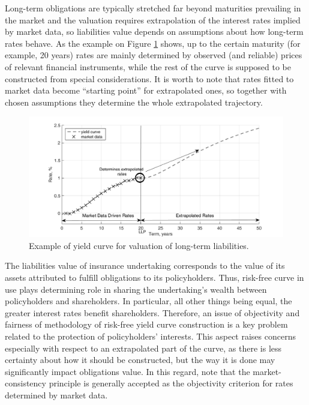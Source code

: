 	Long-term obligations are typically stretched far beyond maturities prevailing in the market and the valuation requires extrapolation of the interest rates implied by market data, so liabilities value depends on assumptions about how long-term rates behave. 
	As the example on Figure \ref{yield_curve_example} shows, up to the certain maturity (for example, 20 years) rates are mainly determined by observed (and reliable) prices of relevant financial instruments, while  the rest of the curve is supposed to be constructed from special considerations. 
	It is worth to note that rates fitted to market data become ``starting point'' for extrapolated ones, so together with chosen assumptions they determine the whole extrapolated trajectory.  
	
\begin{figure}[h]
	\includegraphics[width=\textwidth]{yield_curve_example}
	\caption{Example of yield curve for valuation of long-term liabilities.}
	\label{yield_curve_example}
\end{figure} 

	 The liabilities value of insurance undertaking corresponds to the value of its assets attributed to fulfill obligations to its policyholders. Thus, risk-free curve in use plays determining role in sharing the undertaking's wealth between policyholders and shareholders. 
	In particular, all other things being equal, the greater interest rates benefit shareholders.
	Therefore, an issue of objectivity and fairness of methodology of risk-free yield curve construction is a key problem related to the protection of policyholders' interests. 
	This aspect raises concerns especially with respect to an extrapolated part of the curve, as there is less certainty about how it should be constructed, but the way it is done may significantly impact obligations value.
	In this regard, note that the market-consistency principle is generally accepted as the objectivity criterion for rates determined by market data.

